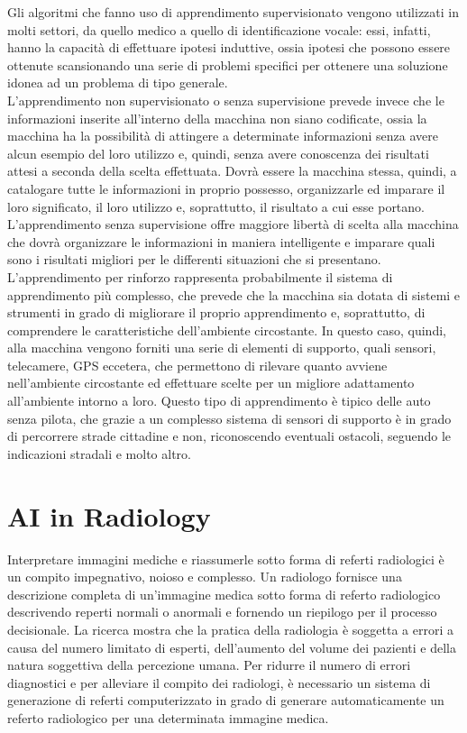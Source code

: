 \documentclass[12pt,a4paper]{report}
\begin{document}
Gli algoritmi che fanno uso di apprendimento supervisionato vengono utilizzati in molti settori, da quello medico a quello di identificazione vocale: essi, infatti, hanno la capacità di effettuare ipotesi induttive, ossia ipotesi che possono essere ottenute scansionando una serie di problemi specifici per ottenere una soluzione idonea ad un problema di tipo generale.
\\
L’apprendimento non supervisionato o senza supervisione prevede invece che le informazioni inserite all’interno della macchina non siano codificate, ossia la macchina ha la possibilità di attingere a determinate informazioni senza avere alcun esempio del loro utilizzo e, quindi, senza avere conoscenza dei risultati attesi a seconda della scelta effettuata. Dovrà essere la macchina stessa, quindi, a catalogare tutte le informazioni in proprio possesso, organizzarle ed imparare il loro significato, il loro utilizzo e, soprattutto, il risultato a cui esse portano. L’apprendimento senza supervisione offre maggiore libertà di scelta alla macchina che dovrà organizzare le informazioni in maniera intelligente e imparare quali sono i risultati migliori per le differenti situazioni che si presentano.
\\
L’apprendimento per rinforzo rappresenta probabilmente il sistema di apprendimento più complesso, che prevede che la macchina sia dotata di sistemi e strumenti in grado di migliorare il proprio apprendimento e, soprattutto, di comprendere le caratteristiche dell’ambiente circostante. In questo caso, quindi, alla macchina vengono forniti una serie di elementi di supporto, quali sensori, telecamere, GPS eccetera, che permettono di rilevare quanto avviene nell’ambiente circostante ed effettuare scelte per un migliore adattamento all’ambiente intorno a loro. Questo tipo di apprendimento è tipico delle auto senza pilota, che grazie a un complesso sistema di sensori di supporto è in grado di percorrere strade cittadine e non, riconoscendo eventuali ostacoli, seguendo le indicazioni stradali e molto altro.




\chapter{AI in Radiology}
Interpretare immagini mediche e riassumerle sotto forma di referti radiologici è un compito impegnativo, noioso e complesso. Un radiologo fornisce una descrizione completa di un'immagine medica sotto forma di referto radiologico descrivendo reperti normali o anormali e fornendo un riepilogo per il processo decisionale. La ricerca mostra che la pratica della radiologia è soggetta a errori a causa del numero limitato di esperti, dell'aumento del volume dei pazienti e della natura soggettiva della percezione umana. Per ridurre il numero di errori diagnostici e per alleviare il compito dei radiologi, è necessario un sistema di generazione di referti computerizzato in grado di generare automaticamente un referto radiologico per una determinata immagine medica.
\end{document}

